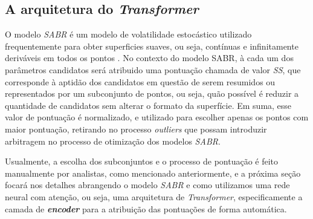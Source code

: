 \subsection{A arquitetura do \textit{Transformer}}
O modelo \textit{SABR} é um modelo de volatilidade estocástico utilizado frequentemente para obter superficies suaves, ou seja, contínuas e infinitamente deriváveis em todos os pontos \citep{Hagan2015}. No contexto do modelo SABR, à cada um dos parâmetros candidatos será atribuido uma pontuação chamada de valor \textit{SS}, que corresponde à aptidão dos candidatos em questão de serem resumidos ou representados por um subconjunto de pontos, ou seja, quão possível é reduzir a quantidade de candidatos sem alterar o formato da superfície. Em suma, esse valor de pontuação é normalizado, e utilizado para escolher apenas os pontos com maior pontuação, retirando no processo \textit{outliers} que possam introduzir arbitragem no processo de otimização dos modelos \textit{SABR}.

Usualmente, a escolha dos subconjuntos e o processo de pontuação é feito manualmente por analistas, como mencionado anteriormente, e a próxima seção focará nos detalhes abrangendo o modelo \textit{SABR} e como utilizamos uma rede neural com atenção, ou seja, uma arquitetura de \textit{Transformer}, especificamente a camada de \textit{\textbf{encoder}} para a atribuição das pontuações de forma automática.

